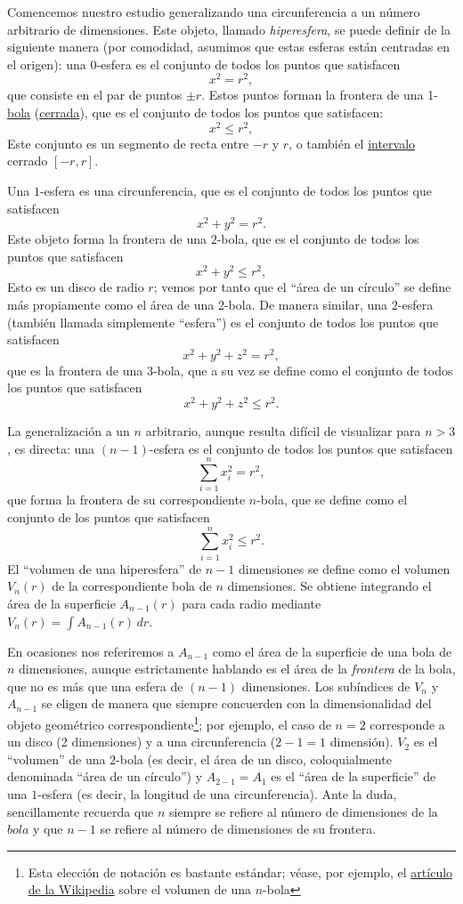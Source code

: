 Comencemos nuestro estudio generalizando una circunferencia a un número arbitrario de dimensiones. Este objeto, llamado \emph{hiperesfera}, se puede definir de la siguiente manera (por comodidad, asumimos que estas esferas están centradas en el origen): una $0$-esfera es el conjunto de todos los puntos que satisfacen
\[
x^2 = r^2,
\]
que consiste en el par de puntos $\pm r$. Estos puntos forman la frontera de una 1-\href{https://es.wikipedia.org/wiki/Bola_(matem%C3%A1tica)}{bola} (\href{https://es.wikipedia.org/wiki/Conjunto_cerrado}{cerrada}), que es el conjunto de todos los puntos que satisfacen:
\[
x^2 \leq r^2,
\]
Este conjunto es un segmento de recta entre $-r$ y $r$, o también el \href{https://es.wikipedia.org/wiki/Intervalo_(matem%C3%A1tica)}{intervalo} cerrado $[-r, r]$. 

Una $1$-esfera es una circunferencia, que es el conjunto de todos los puntos que satisfacen
\[
x^2 + y^2 = r^2.
\]
Este objeto forma la frontera de una $2$-bola, que es el conjunto de todos los puntos que satisfacen
\[
x^2 + y^2 \leq r^2,
\]
Esto es un disco de radio $r$; vemos por tanto que el ``área de un círculo'' se define más propiamente como el área de una $2$-bola. De manera similar, una $2$-esfera (también llamada simplemente ``esfera'') es el conjunto de todos los puntos que satisfacen
\[
x^2 + y^2 + z^2 = r^2,
\]
que es la frontera de una $3$-bola, que a su vez se define como el conjunto de todos los puntos que satisfacen
\[
x^2 + y^2 + z^2 \leq r^2.
\]

La generalización a un $n$ arbitrario, aunque resulta difícil de visualizar para $n > 3$, es directa: una $(n-1)$-esfera es el conjunto de todos los puntos que satisfacen
\[
\sum_{i=1}^{n} x_i^2 = r^2,
\]
que forma la frontera de su correspondiente $n$-bola, que se define como el conjunto de los puntos que satisfacen
\[
\sum_{i=1}^{n} x_i^2 \leq r^2.
\]
El ``volumen de una hiperesfera'' de $n-1$ dimensiones se define como el volumen $V_n(r)$ de la correspondiente bola de $n$ dimensiones. Se obtiene integrando el área de la superficie $A_{n-1}(r)$ para cada radio mediante $V_n(r) = \int A_{n-1}(r)\,dr$.

En ocasiones nos referiremos a $A_{n-1}$ como el área de la superficie de una bola de $n$ dimensiones, aunque estrictamente hablando es el área de la \emph{frontera} de la bola, que no es más que una esfera de $(n-1)$ dimensiones. Los subíndices de $V_n$ y $A_{n-1}$ se eligen de manera que siempre concuerden con la dimensionalidad del objeto geométrico correspondiente\footnote{Esta elección de notación es bastante estándar; véase, por ejemplo, el \href{https://es.wikipedia.org/wiki/Volumen_de_una_n-bola}{artículo de la Wikipedia} sobre el volumen de una $n$-bola}; por ejemplo, el caso de $n=2$ corresponde a un disco (2 dimensiones) y a una circunferencia ($2-1 = 1$ dimensión). $V_2$ es el ``volumen'' de una $2$-bola (es decir, el área de un disco, coloquialmente denominada ``área de un círculo'') y $A_{2-1} = A_1$ es el ``área de la superficie'' de una $1$-esfera (es decir, la longitud de una circunferencia). Ante la duda, sencillamente recuerda que $n$ siempre se refiere al número de dimensiones de la $bola$ y que $n-1$ se refiere al número de dimensiones de su frontera. 

